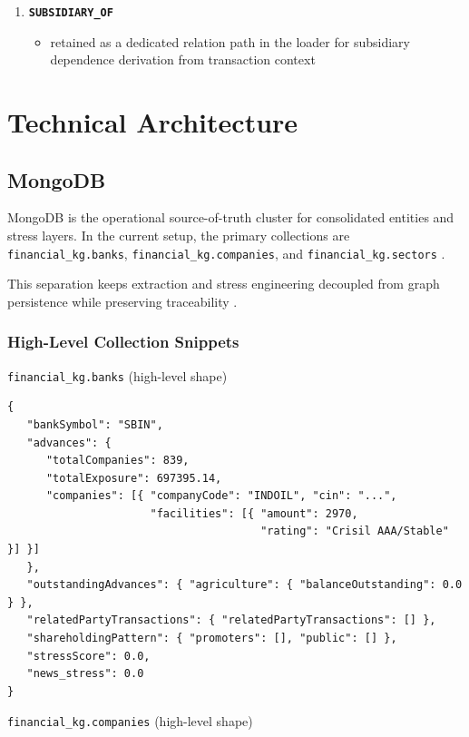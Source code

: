 \begin{enumerate}
  \item \textbf{\texttt{SUBSIDIARY\_OF}}
  \begin{itemize}
    \item retained as a dedicated relation path in the loader for subsidiary dependence derivation from transaction context \cite{ref14}
  \end{itemize}
\end{enumerate}

\section{Technical Architecture}

\subsection{MongoDB}

MongoDB is the operational source-of-truth cluster for consolidated entities and stress layers. In the current setup, the primary collections are \texttt{financial\_kg.banks}, \texttt{financial\_kg.companies}, and \texttt{financial\_kg.sectors} \cite{ref22}.

This separation keeps extraction and stress engineering decoupled from graph persistence while preserving traceability \cite{ref14}.

\subsubsection{High-Level Collection Snippets}

\texttt{financial\_kg.banks} (high-level shape)

\begin{lstlisting}[style=json]
{
   "bankSymbol": "SBIN",
   "advances": {
      "totalCompanies": 839,
      "totalExposure": 697395.14,
      "companies": [{ "companyCode": "INDOIL", "cin": "...",
                      "facilities": [{ "amount": 2970,
                                       "rating": "Crisil AAA/Stable" }] }]
   },
   "outstandingAdvances": { "agriculture": { "balanceOutstanding": 0.0 } },
   "relatedPartyTransactions": { "relatedPartyTransactions": [] },
   "shareholdingPattern": { "promoters": [], "public": [] },
   "stressScore": 0.0,
   "news_stress": 0.0
}
\end{lstlisting}

\texttt{financial\_kg.companies} (high-level shape)

